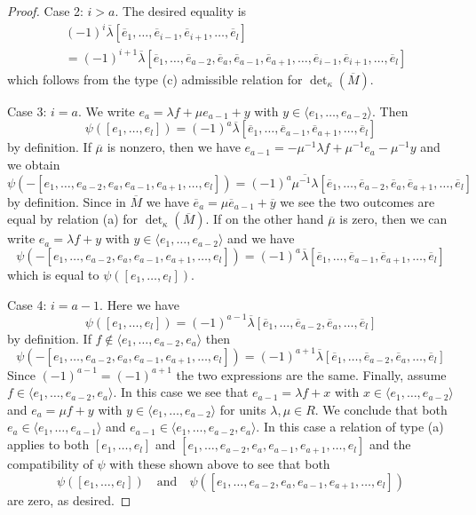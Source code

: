 \documentclass[10pt,a4paper]{amsart}
\theoremstyle{plain}
\theoremstyle{definition}
\theoremstyle{remark}
\numberwithin{equation}{subsection}
\begin{document}
\begin{proof}
\medskip\noindent
Case 2: $i > a$. The desired equality is
\begin{align*}
& (-1)^i
\overline{\lambda}
[\overline{e}_1,
\ldots,
\overline{e}_{i - 1},
\overline{e}_{i + 1},
\ldots,
\overline{e}_l] \\
& =
(-1)^{i + 1}
\overline{\lambda}
[\overline{e}_1,
\ldots,
\overline{e}_{a - 2},
\overline{e}_a,
\overline{e}_{a - 1},
\overline{e}_{a + 1},
\ldots,
\overline{e}_{i - 1},
\overline{e}_{i + 1},
\ldots,
\overline{e}_l]
\end{align*}
which follows from the type (c) admissible relation for
$\det_\kappa(\overline{M})$.

\medskip\noindent
Case 3: $i = a$. We write $e_a = \lambda f + \mu e_{a - 1} + y$
with $y \in \langle e_1, \ldots, e_{a - 2}\rangle$. Then
$$
\psi([e_1, \ldots, e_l]) =
(-1)^a
\overline{\lambda}
[\overline{e}_1,
\ldots,
\overline{e}_{a - 1},
\overline{e}_{a + 1},
\ldots,
\overline{e}_l]
$$
by definition. If $\overline{\mu}$ is nonzero, then we have
$e_{a - 1} = - \mu^{-1} \lambda f + \mu^{-1}e_a - \mu^{-1} y$
and we obtain
$$
\psi(-[e_1, \ldots, e_{a - 2}, e_a, e_{a - 1}, e_{a + 1}, \ldots, e_l]) =
(-1)^a
\overline{\mu^{-1}\lambda}
[\overline{e}_1,
\ldots,
\overline{e}_{a - 2},
\overline{e}_a,
\overline{e}_{a + 1},
\ldots,
\overline{e}_l]
$$
by definition. Since in $\overline{M}$ we have
$\overline{e}_a = \mu \overline{e}_{a - 1} + \overline{y}$ we see
the two outcomes are equal by relation (a) for $\det_\kappa(\overline{M})$.
If on the other hand $\overline{\mu}$ is zero, then we can write
$e_a = \lambda f + y$ with $y \in \langle e_1, \ldots, e_{a - 2}\rangle$
and we have
$$
\psi(-[e_1, \ldots, e_{a - 2}, e_a, e_{a - 1}, e_{a + 1}, \ldots, e_l]) =
(-1)^a
\overline{\lambda}
[\overline{e}_1,
\ldots,
\overline{e}_{a - 1},
\overline{e}_{a + 1},
\ldots,
\overline{e}_l]
$$
which is equal to $\psi([e_1, \ldots, e_l])$.

\medskip\noindent
Case 4: $i = a - 1$. Here we have
$$
\psi([e_1, \ldots, e_l]) =
(-1)^{a - 1}
\overline{\lambda}
[\overline{e}_1,
\ldots,
\overline{e}_{a - 2},
\overline{e}_a,
\ldots,
\overline{e}_l]
$$
by definition. If $f \not \in \langle e_1, \ldots, e_{a - 2}, e_a \rangle$
then
$$
\psi(-[e_1, \ldots, e_{a - 2}, e_a, e_{a - 1}, e_{a + 1}, \ldots, e_l]) =
(-1)^{a + 1}\overline{\lambda}
[\overline{e}_1,
\ldots,
\overline{e}_{a - 2},
\overline{e}_a,
\ldots,
\overline{e}_l]
$$
Since $(-1)^{a - 1} = (-1)^{a + 1}$ the two expressions are the same.
Finally, assume $f \in \langle e_1, \ldots, e_{a - 2}, e_a \rangle$.
In this case we see that $e_{a - 1} = \lambda f + x$ with
$x \in \langle e_1, \ldots, e_{a - 2}\rangle$ and
$e_a = \mu f + y$ with $y \in \langle e_1, \ldots, e_{a - 2}\rangle$
for units $\lambda, \mu \in R$.
We conclude that both
$e_a \in \langle e_1, \ldots, e_{a - 1} \rangle$ and
$e_{a - 1} \in \langle e_1, \ldots, e_{a - 2}, e_a\rangle$.
In this case a relation of type (a) applies to both
$[e_1, \ldots, e_l]$ and
$[e_1, \ldots, e_{a - 2}, e_a, e_{a - 1}, e_{a + 1}, \ldots, e_l]$
and the compatibility of $\psi$ with these shown above to see that both
$$
\psi([e_1, \ldots, e_l])
\quad\text{and}\quad
\psi([e_1, \ldots, e_{a - 2}, e_a, e_{a - 1}, e_{a + 1}, \ldots, e_l])
$$
are zero, as desired.


\end{proof}
\end{document}
